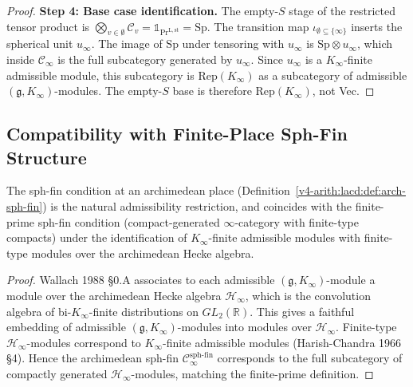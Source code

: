 \begin{proof}
\textbf{Step 4: Base case identification.} The empty-\(S\) stage of the
restricted tensor product is \(\bigotimes_{v \in \emptyset}\mathcal{C}_{v}
= \mathbb{1}_{\mathrm{Pr}^{\mathrm{L,st}}} = \mathrm{Sp}\). The
transition map \(\iota_{\emptyset \subseteq \{\infty\}}\) inserts the
spherical unit \(u_{\infty}\). The image of \(\mathrm{Sp}\) under
tensoring with \(u_{\infty}\) is \(\mathrm{Sp} \otimes u_{\infty}\), which
inside \(\mathcal{C}_{\infty}\) is the full subcategory generated by
\(u_{\infty}\). Since \(u_{\infty}\) is a \(K_{\infty}\)-finite admissible
module, this subcategory is \(\mathrm{Rep}(K_{\infty})\) as a
subcategory of admissible \((\mathfrak{g}, K_{\infty})\)-modules. The
empty-\(S\) base is therefore \(\mathrm{Rep}(K_{\infty})\), not Vec.
\end{proof}

\subsection{Compatibility with Finite-Place Sph-Fin Structure}

\begin{proposition}
\label{v4-arith:lacd:prop:uniformity-sph-fin}
The sph-fin condition at an archimedean
place (Definition~\ref{v4-arith:lacd:def:arch-sph-fin}) is the natural
admissibility restriction, and coincides with the finite-prime
sph-fin condition (compact-generated \(\infty\)-category with
finite-type compacts) under the identification of \(K_{\infty}\)-finite
admissible modules with finite-type modules over the archimedean
Hecke algebra.
\end{proposition}

\begin{proof}
Wallach 1988 \S0.A associates to each admissible
\((\mathfrak{g}, K_{\infty})\)-module a module over the archimedean
Hecke algebra \(\mathcal{H}_{\infty}\), which is the convolution
algebra of bi-\(K_{\infty}\)-finite distributions on \(GL_{2}(\mathbb{R})\).
This gives a faithful embedding of admissible
\((\mathfrak{g}, K_{\infty})\)-modules into modules over
\(\mathcal{H}_{\infty}\). Finite-type \(\mathcal{H}_{\infty}\)-modules
correspond to \(K_{\infty}\)-finite admissible modules
(Harish-Chandra 1966 \S4). Hence the archimedean sph-fin
\(\mathcal{C}_{\infty}^{\mathrm{sph\text{-}fin}}\) corresponds to the
full subcategory of compactly generated
\(\mathcal{H}_{\infty}\)-modules, matching the finite-prime definition.
\end{proof}

